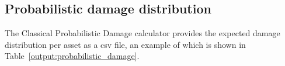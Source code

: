 \subsection{Probabilistic damage distribution}

The Classical Probabilistic Damage calculator provides the expected damage
distribution per asset as a csv file, an example of which is shown in
Table~\ref{output:probabilistic_damage}.


